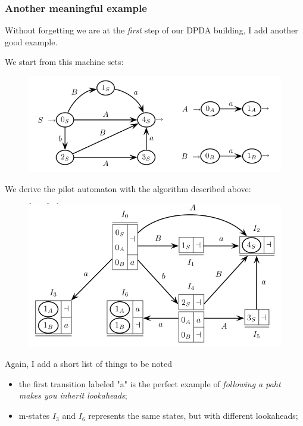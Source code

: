 			\subsubsection{Another meaningful example}
				Without forgetting we are at the \emph{first} step of our DPDA building, I add another good example.

				We start from this machine sets:
				\begin{figure}[H]
					\begin{center}
						\includegraphics[width = \textwidth]{./images/ex2.png}
					\end{center}
				\end{figure}
				We derive the pilot automaton with the algorithm described above:
				\begin{figure}[H]
					\begin{center}
						\includegraphics[width = \textwidth]{./images/ex2Pilot.png}
					\end{center}
				\end{figure}
				Again, I add a short list of things to be noted
				\begin{itemize}
					\item the first transition labeled "a" is the perfect example of \emph{following a paht makes you inherit lookaheads};
					\item m-states $I_3$ and $I_6$ represents the same states, but with different lookaheads;
				\end{itemize}
				
